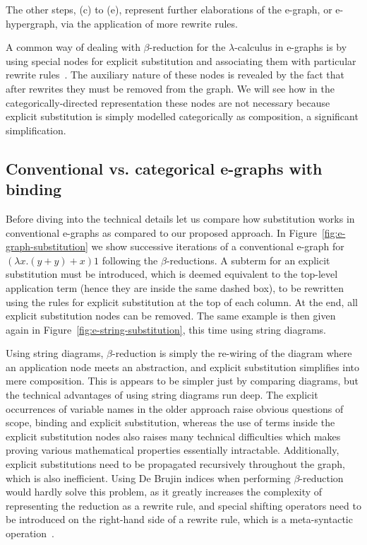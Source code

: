 \documentclass[]{IEEEtran}
\begin{document}
The other steps, (c) to (e), represent further elaborations of the e-graph, or e-hypergraph, via the application of more rewrite rules.

A common way of dealing with $\beta$-reduction for the $\lambda$-calculus in e-graphs is by using special nodes for explicit substitution and associating them with particular rewrite rules~\cite{EggPaper,koehler2022sketchguided}.
The auxiliary nature of these nodes is revealed by the fact that after rewrites they must be removed from the graph. 
We will see how in the categorically-directed representation these nodes are not necessary because explicit substitution is simply modelled categorically as composition, a significant simplification.

\subsection{Conventional vs. categorical e-graphs with binding}

Before diving into the technical details let us compare how substitution works in conventional e-graphs as compared to our proposed approach.
In Figure~\ref{fig:e-graph-substitution} we show successive iterations of a conventional e-graph for $(\lambda x . (y + y) + x) 1$ following the $\beta$-reductions.
A subterm for an explicit substitution must be introduced, which is deemed equivalent to the top-level application term (hence they are inside the same dashed box), to be rewritten using the rules for explicit substitution at the top of each column.
At the end, all explicit substitution nodes can be removed.
The same example is then given again in Figure~\ref{fig:e-string-substitution}, this time using string diagrams. 

Using string diagrams, $\beta$-reduction is simply the re-wiring of the diagram where an application node meets an abstraction, and explicit substitution simplifies into mere composition. 
This is appears to be simpler just by comparing diagrams, but the technical advantages of using string diagrams run deep. 
The explicit occurrences of variable names in the older approach raise obvious questions of scope, binding and explicit substitution, whereas the use of terms inside the explicit substitution nodes also raises many technical difficulties which makes proving various mathematical properties essentially intractable. 
Additionally, explicit substitutions need to be propagated recursively throughout the graph, which is also inefficient. 
Using De Brujin indices when performing $\beta$-reduction would hardly solve this problem, as it greatly increases the complexity of representing the reduction as a rewrite rule, and special shifting operators need to be introduced on the right-hand side of a rewrite rule, which is a meta-syntactic operation~\cite{koehler2022sketchguided}.
\end{document}
